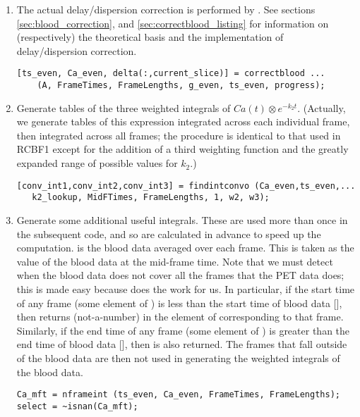 \begin{enumerate}
\item The actual delay/dispersion correction is performed by
  .  See sections \ref{sec:blood_correction}, and
  \ref{sec:correctblood_listing} for information on (respectively) the
  theoretical basis and the implementation of delay/dispersion
  correction.
  \begin{verbatim}
[ts_even, Ca_even, delta(:,current_slice)] = correctblood ...
    (A, FrameTimes, FrameLengths, g_even, ts_even, progress);
  \end{verbatim}

\item Generate tables of the three weighted integrals of $Ca(t)
  \otimes e^{-k_{2}t}$.  (Actually, we generate tables of this
  expression integrated across each individual frame, then integrated
  across all frames; the procedure is identical to that used in RCBF1
  except for the addition of a third weighting function and the
  greatly expanded range of possible values for $k_2$.)
  \begin{verbatim}
[conv_int1,conv_int2,conv_int3] = findintconvo (Ca_even,ts_even,...
   k2_lookup, MidFTimes, FrameLengths, 1, w2, w3);
  \end{verbatim}

\item Generate some additional useful integrals.  These are used more
  than once in the subsequent code, and so are calculated in advance
  to speed up the computation.   is the blood data
  averaged over each frame.  This is taken as the value of the blood
  data at the mid-frame time.  Note that we must detect when the blood
  data does not cover all the frames that the PET data does; this is
  made easy because  does the work for us.  In
  particular, if the start time of any frame (some element of
  ) is less than the start time of blood data
  [], then  returns 
  (not-a-number) in the element of  corresponding to that
  frame.  Similarly, if the end time of any frame (some element of
  ) is greater than the end time of
  blood data [], then 
  is also returned.  The frames that fall outside of the blood data
  are then not used in generating the weighted integrals of the blood data.
\begin{verbatim}
Ca_mft = nframeint (ts_even, Ca_even, FrameTimes, FrameLengths);      
select = ~isnan(Ca_mft);


\end{verbatim}
\end{enumerate}
